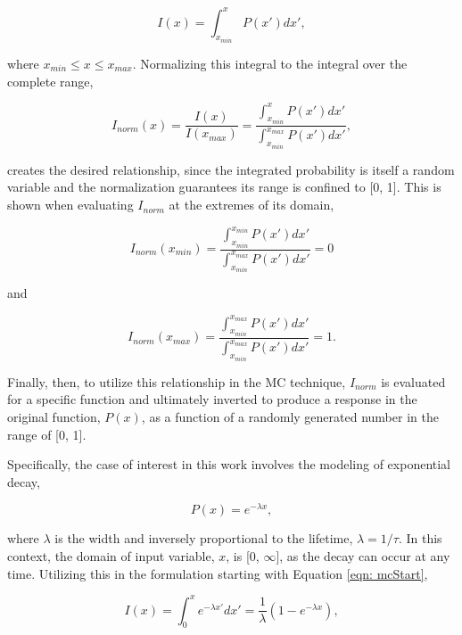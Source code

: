 \begin{equation}
I(x) = \int_{x_{min}}^{x} P(x') dx',
\label{eqn: mcStart}
\end{equation}

\noindent where $x_{min} \leq x \leq x_{max}$. Normalizing this integral to the integral over the complete range,

\begin{equation}
I_{norm}(x) = \dfrac{I(x)}{I(x_{max})} = \dfrac{\int_{x_{min}}^{x} P(x') dx'}{\int_{x_{min}}^{x_{max}} P(x') dx'},
\end{equation}

\noindent creates the desired relationship, since the integrated probability is itself a random variable and the normalization guarantees its range is confined to [0, 1]. This is shown when evaluating $I_{norm}$ at the extremes of its domain,

\begin{equation}
I_{norm} (x_{min}) = \dfrac{\int_{x_{min}}^{x_{min}} P(x') dx'}{\int_{x_{min}}^{x_{max}} P(x') dx'} = 0
\end{equation}

\noindent and

\begin{equation}
I_{norm} (x_{max}) = \dfrac{\int_{x_{min}}^{x_{max}} P(x') dx'}{\int_{x_{min}}^{x_{max}} P(x') dx'} = 1.
\end{equation}

\noindent Finally, then, to utilize this relationship in the MC technique, $I_{norm}$ is evaluated for a specific function and ultimately inverted to produce a response in the original function, $P(x)$, as a function of a randomly generated number in the range of [0, 1].

Specifically, the case of interest in this work involves the modeling of exponential decay,

\begin{equation}
P(x) = e^{-\lambda x},
\end{equation}

\noindent where $\lambda$ is the width and inversely proportional to the lifetime, $\lambda = 1/ \tau$. In this context, the domain of input variable, $x$, is [0, $\infty$], as the decay can occur at any time. Utilizing this in the formulation starting with Equation \ref{eqn: mcStart},

\begin{equation}
I(x) = \int_{0}^{x} e^{-\lambda x'} dx' = \frac{1}{\lambda} (1 - e^{-\lambda x}),
\end{equation}

